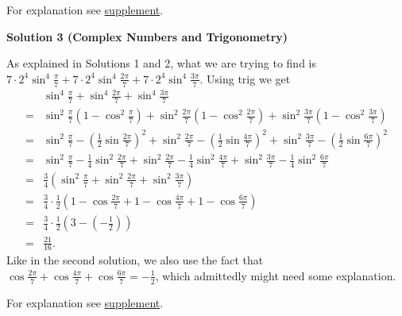 \begin{enumerate}
 For explanation see \href{https://artofproblemsolving.com/wiki/index.php/2022\_AMC\_12B\_Problems/Problem\_24\#Supplement\_.28Explanation\_to\_Why\_cos.282.CF.80.2F7.29\_.2B\_cos.284.CF.80.2F7.29\_.2B\_cos.286.CF.80.2F7.29\_.3D\_-1.2F2.29}{supplement}.

 



\textbf{Solution 3 (Complex Numbers and Trigonometry)}

As explained in Solutions 1 and 2, what we are trying to find is $7 \cdot 2^4 \sin^4 \frac{\pi}{7} + 7 \cdot 2^4 \sin^4 \frac{2 \pi}{7} + 7 \cdot 2^4 \sin^4 \frac{3 \pi}{7}$. Using trig we get 
 \begin{align*}  & \sin^4 \frac{\pi}{7} + \sin^4 \frac{2 \pi}{7} + \sin^4 \frac{3 \pi}{7} \\ = & \sin^2 \frac{\pi}{7} \left(1 - \cos^2 \frac{\pi}{7} \right) + \sin^2 \frac{2\pi}{7} \left(1 - \cos^2 \frac{2\pi}{7} \right) + \sin^2 \frac{3\pi}{7} \left(1 - \cos^2 \frac{3\pi}{7} \right) \\ = & \sin^2 \frac{\pi}{7} - \left(\frac{1}{2} \sin \frac{2\pi}{7}\right)^2 + \sin^2 \frac{2\pi}{7} - \left(\frac{1}{2} \sin \frac{4\pi}{7}\right)^2 + \sin^2 \frac{3\pi}{7} - \left(\frac{1}{2} \sin \frac{6\pi}{7}\right)^2\\ = & \sin^2 \frac{\pi}{7} - \frac{1}{4} \sin^2 \frac{2\pi}{7} + \sin^2 \frac{2\pi}{7} - \frac{1}{4} \sin^2 \frac{4\pi}{7} + \sin^2 \frac{3\pi}{7} - \frac{1}{4} \sin^2 \frac{6\pi}{7} \\ = & \frac{3}{4} \left(\sin^2 \frac{\pi}{7} + \sin^2 \frac{2\pi}{7} + \sin^2 \frac{3\pi}{7}\right) \\ = & \frac{3}{4} \cdot \frac{1}{2} \left(1 - \cos \frac{2\pi}{7} + 1 - \cos \frac{4\pi}{7} + 1 - \cos \frac{6\pi}{7} \right)\\ = & \frac{3}{4} \cdot \frac{1}{2} \left(3 - \left(-\frac{1}{2}\right)\right) \\ = & \frac{21}{16}. \end{align*}
Like in the second solution, we also use the fact that $\cos \frac{2\pi}{7} + \cos \frac{4\pi}{7} + \cos \frac{6\pi}{7} = -\frac{1}{2}$, which admittedly might need some explanation. 

 For explanation see \href{https://artofproblemsolving.com/wiki/index.php/2022\_AMC\_12B\_Problems/Problem\_24\#Supplement\_.28Explanation\_to\_Why\_cos.282.CF.80.2F7.29\_.2B\_cos.284.CF.80.2F7.29\_.2B\_cos.286.CF.80.2F7.29\_.3D\_-1.2F2.29}{supplement}.


\end{enumerate}
